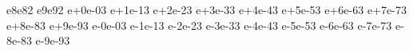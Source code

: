 {            {e8}{{\textcolor{dkRed}{e8}}}{2}%
            {e9}{{\textcolor{dkRed}{e9}}}{2}%
            {e+0}{{\textcolor{dkRed}{e-0}}}{3}%
            {e+1}{{\textcolor{dkRed}{e-1}}}{3}%
            {e+2}{{\textcolor{dkRed}{e-2}}}{3}%
            {e+3}{{\textcolor{dkRed}{e-3}}}{3}%
            {e+4}{{\textcolor{dkRed}{e-4}}}{3}%
            {e+5}{{\textcolor{dkRed}{e-5}}}{3}%
            {e+6}{{\textcolor{dkRed}{e-6}}}{3}%
            {e+7}{{\textcolor{dkRed}{e-7}}}{3}%
            {e+8}{{\textcolor{dkRed}{e-8}}}{3}%
            {e+9}{{\textcolor{dkRed}{e-9}}}{3}%
            {e-0}{{\textcolor{dkRed}{e-0}}}{3}%
            {e-1}{{\textcolor{dkRed}{e-1}}}{3}%
            {e-2}{{\textcolor{dkRed}{e-2}}}{3}%
            {e-3}{{\textcolor{dkRed}{e-3}}}{3}%
            {e-4}{{\textcolor{dkRed}{e-4}}}{3}%
            {e-5}{{\textcolor{dkRed}{e-5}}}{3}%
            {e-6}{{\textcolor{dkRed}{e-6}}}{3}%
            {e-7}{{\textcolor{dkRed}{e-7}}}{3}%
            {e-8}{{\textcolor{dkRed}{e-8}}}{3}%
            {e-9}{{\textcolor{dkRed}{e-9}}}{3}
}



